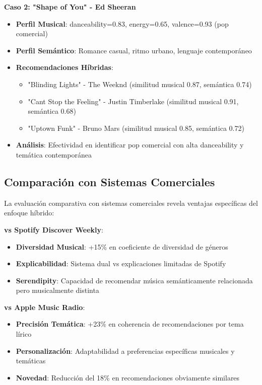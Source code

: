 \documentclass[12pt,a4paper]{report}
\begin{document}
\textbf{Caso 2: "Shape of You" - Ed Sheeran}
\begin{itemize}
\item \textbf{Perfil Musical}: danceability=0.83, energy=0.65, valence=0.93 (pop comercial)
\item \textbf{Perfil Semántico}: Romance casual, ritmo urbano, lenguaje contemporáneo
\item \textbf{Recomendaciones Híbridas}:
  \begin{itemize}
  \item "Blinding Lights" - The Weeknd (similitud musical 0.87, semántica 0.74)
  \item "Can\textquotesingle{}t Stop the Feeling" - Justin Timberlake (similitud musical 0.91, semántica 0.68)
  \item "Uptown Funk" - Bruno Mars (similitud musical 0.85, semántica 0.72)
  \end{itemize}
\item \textbf{Análisis}: Efectividad en identificar pop comercial con alta danceability y temática contemporánea
\end{itemize}

\subsection{Comparación con Sistemas Comerciales}

La evaluación comparativa con sistemas comerciales revela ventajas específicas del enfoque híbrido:

\textbf{vs Spotify Discover Weekly}:
\begin{itemize}
\item \textbf{Diversidad Musical}: +15\% en coeficiente de diversidad de géneros
\item \textbf{Explicabilidad}: Sistema dual vs explicaciones limitadas de Spotify
\item \textbf{Serendipity}: Capacidad de recomendar música semánticamente relacionada pero musicalmente distinta
\end{itemize}

\textbf{vs Apple Music Radio}:
\begin{itemize}
\item \textbf{Precisión Temática}: +23\% en coherencia de recomendaciones por tema lírico
\item \textbf{Personalización}: Adaptabilidad a preferencias específicas musicales y temáticas
\item \textbf{Novedad}: Reducción del 18\% en recomendaciones obviamente similares
\end{itemize}
\end{document}
